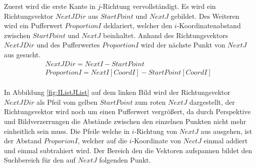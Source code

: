 Zuerst wird die erste Kante in $j$-Richtung vervollständigt. Es wird ein Richtungsvektor $NextJDir$ aus $StartPoint$ und $NextJ$ gebildet. Des Weiteren wird ein Pufferwert $ProportionI$ deklariert, welcher den $i$-Koordinatenabstand zwischen $StartPoint$ und $NextJ$ beinhaltet. Anhand des Richtungsvektors $NextJDir$ und des Pufferwertes $ProportionI$ wird der nächste Punkt von $NextJ$ aus gesucht. \\

\begin{gather*}
	NextJDir = NextI - StartPoint\\
	ProportionI = NextI[CoordI]-StartPoint[CoordI]
\end{gather*}\\

In Abbildung \ref{fig:IListJList} auf dem linken Bild wird der Richtungsvektor $NextJDir$ als Pfeil vom gelben $StartPoint$ zum roten $NextJ$ dargestellt, der Richtungsvektor wird noch um einen Pufferwert vergrößert, da durch Perspektive und Bildverzerrungen die Abstände zwischen den einzelnen Punkten nicht mehr einheitlich sein muss. Die Pfeile welche in $i$-Richtung von $NextJ$ aus ausgehen, ist der Abstand $ProporionI$, welcher auf die $i$-Koordinate von $NectJ$ einmal addiert und einmal subtrahiert wird. Der Bereich den die Vektoren aufspannen bildet den Suchbereich für den auf $NextJ$ folgenden Punkt.\\


